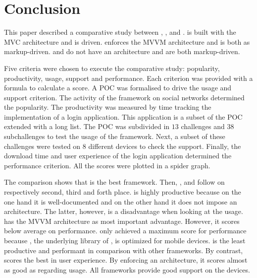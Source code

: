 \documentclass[a4paper]{artikel3}
\begin{document}

\section{Conclusion} %
\label{sec:conclusion}


This paper described a comparative study between \sta{},  \kendoa{},  \jqma{} and \lungo{}.
\sta{} is built with the MVC architecture and is \js{} driven.
\kendoa{} enforces the MVVM architecture and is both \js{} as markup-driven.
\jqma{} and \lungo{} do not have an architecture and are both markup-driven.

Five criteria were chosen to execute the comparative study:  popularity,  productivity,  usage,  support and performance.
Each criterion was provided with a formula to calculate a score.
A POC was formalised to drive the usage and support criterion.
The activity of the framework on social networks determined the popularity.
The productivity was measured by time tracking the implementation of a login application.
This application is a subset of the POC extended with a long list.
The POC was subdivided in $13$ challenges and $38$ subchallenges to test the usage of the framework.
Next,  a subset of these challenges were tested on $8$ different devices to check the support.
Finally,  the download time and user experience of the login application determined the performance criterion.
All the scores were plotted in a spider graph.

The comparison shows that \jqma{} is the best framework.
Then, \kendoa{},  \lungo{} and \sta{} follow on respectively second, third and forth place.
\jqma{} is highly productive because on the one hand it is well-documented and on the other hand it does not impose an architecture.
The latter,  however,  is a disadvantage when looking at the usage.
\kendoa{} has the MVVM architecture as most important advantage.
However,  it scores below average on performance.
\lungo{} only achieved a maximum score for performance because \quo{},  the underlying \js{} library of \lungo{},  is optimized for mobile devices.
\sta{} is the least productive and performant in comparison with other frameworks.
By contrast,  \sta{} scores the best in user experience.
By enforcing an architecture,  it scores almost as good as \kendoa{} regarding usage.
All frameworks provide good support on the devices.
\end{document}
